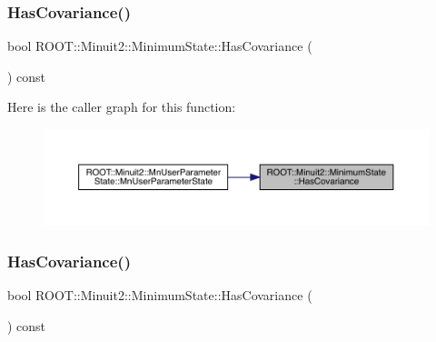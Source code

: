 \subsubsection{\texorpdfstring{HasCovariance()}{HasCovariance()}\hspace{0.1cm}{\footnotesize\ttfamily [1/2]}}
{\footnotesize\ttfamily bool R\+O\+O\+T\+::\+Minuit2\+::\+Minimum\+State\+::\+Has\+Covariance (\begin{DoxyParamCaption}{ }\end{DoxyParamCaption}) const\hspace{0.3cm}{\ttfamily [inline]}}

Here is the caller graph for this function\+:\nopagebreak
\begin{figure}[H]
\begin{center}
\leavevmode
\includegraphics[width=350pt]{db/dcd/classROOT_1_1Minuit2_1_1MinimumState_aba1e55d52217a591657dba0cc9fa8c9c_icgraph}
\end{center}
\end{figure}
\mbox{\label{classROOT_1_1Minuit2_1_1MinimumState_aba1e55d52217a591657dba0cc9fa8c9c}} 
\subsubsection{\texorpdfstring{HasCovariance()}{HasCovariance()}\hspace{0.1cm}{\footnotesize\ttfamily [2/2]}}
{\footnotesize\ttfamily bool R\+O\+O\+T\+::\+Minuit2\+::\+Minimum\+State\+::\+Has\+Covariance (\begin{DoxyParamCaption}{ }\end{DoxyParamCaption}) const\hspace{0.3cm}{\ttfamily [inline]}}

\mbox{\label{classROOT_1_1Minuit2_1_1MinimumState_a5871d5838abf68982d9e2ed7a66ea5c3}} 
